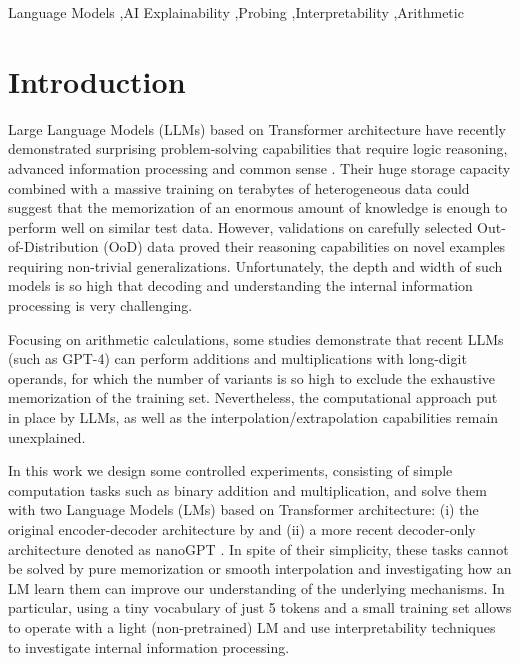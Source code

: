 \documentclass[final,1p,times,authoryear]{elsarticle}
\begin{document}
\begin{frontmatter}
\begin{keyword}
Language Models \sep AI Explainability \sep Probing \sep Interpretability \sep Arithmetic


\end{keyword}

\end{frontmatter}


\section{Introduction}

Large Language Models (LLMs) based on Transformer architecture \citep{Vaswani2017} have recently demonstrated surprising problem-solving capabilities that require logic reasoning, advanced information processing and common sense \citep{Bubeck2023, Wei2023,Wei2022}. Their huge storage capacity combined with a massive training on terabytes of heterogeneous data could suggest that the memorization of an enormous amount of knowledge is enough to perform well on similar test data. However, validations on carefully selected Out-of-Distribution (OoD) data proved their reasoning capabilities on novel examples requiring non-trivial generalizations. Unfortunately, the depth and width of such models is so high that decoding and understanding the internal information processing is very challenging.

Focusing on arithmetic calculations, some studies \citep{Yuan2023} demonstrate that recent LLMs (such as GPT-4) can perform additions and multiplications with long-digit operands, for which the number of variants is so high to exclude the exhaustive memorization of the training set. Nevertheless, the computational approach put in place by LLMs, as well as the interpolation/extrapolation capabilities remain unexplained.

In this work we design some controlled experiments, consisting of simple computation tasks such as binary addition and multiplication, and solve them with two Language Models (LMs) based on Transformer architecture: (i) the original encoder-decoder architecture by \citet{Vaswani2017} and (ii) a more recent decoder-only architecture denoted as nanoGPT \citep{Karpathy2022}. In spite of their simplicity, these tasks cannot be solved by pure memorization or smooth interpolation and investigating how an LM learn them can improve our understanding of the underlying mechanisms. In particular, using a tiny vocabulary of just 5 tokens and a small training set allows to operate with a light (non-pretrained) LM and use interpretability techniques to investigate internal information processing.
\end{document}
